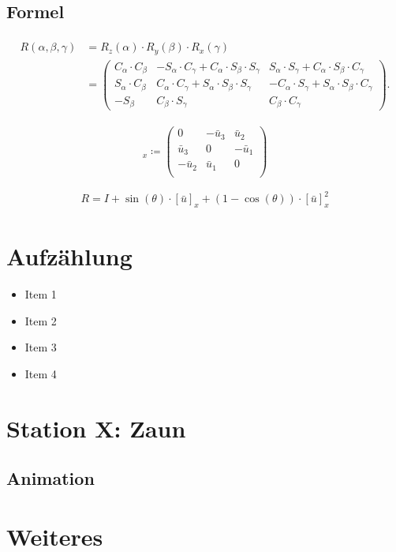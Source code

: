 \subsection{Formel}

\begin{align}
	\begin{split}
		R(\alpha, \beta, \gamma) &=  R_z(\alpha) \cdot R_y(\beta) \cdot R_x(\gamma)\\
		&=\begin{pmatrix}
			C_\alpha\cdot C_\beta & -S_\alpha \cdot C_\gamma + C_\alpha \cdot S_\beta \cdot S_\gamma  & S_\alpha \cdot S_\gamma + C_\alpha \cdot S_\beta \cdot C_\gamma  \\
			S_\alpha\cdot C_\beta & C_\alpha\cdot C_\gamma + S_\alpha\cdot S_\beta\cdot S_\gamma & -C_\alpha\cdot S_\gamma + S_\alpha \cdot S_\beta \cdot C_\gamma \\
			-S_\beta & C_\beta \cdot S_\gamma & C_\beta \cdot C_\gamma
		\end{pmatrix}.
	\end{split}
	\label{EulerToRot}
\end{align}

\begin{equation*}
	[\bar{u}]_x \coloneqq
	\begin{pmatrix}
		0 & -\bar{u}_3 & \bar{u}_2 \\
		\bar{u}_3 & 0 & -\bar{u}_1 \\
		-\bar{u}_2 & \bar{u}_1 & 0 \\
	\end{pmatrix}
\end{equation*}

\begin{align}
	\label{VecToRot1}
	R = I + \sin(\theta)\cdot [\bar{u}]_x + (1-\cos(\theta))\cdot [\bar{u}]_x^2
\end{align}

\section{Aufzählung}
\begin{itemize}
	\item Item 1
	\item Item 2
	\item Item 3
	\item Item 4
\end{itemize}




\section{Station X: Zaun}
\subsection{Animation}

\section{Weiteres}


